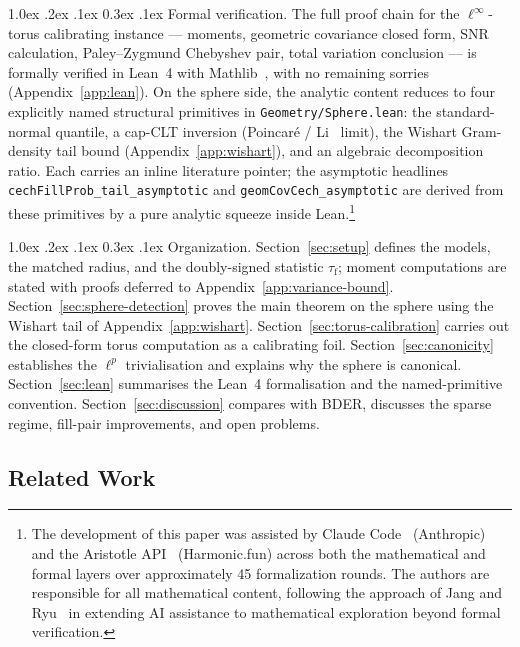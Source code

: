 \documentclass[reqno,12pt]{amsart}
\makeatletter
\renewcommand\paragraph{\@startsection{paragraph}{4}{\z@}%
  {1.0ex \@plus .2ex \@minus .1ex}%
  {0.3ex \@plus .1ex}%
  {\normalfont\normalsize\bfseries}}
\newcommand{\tauf}{\tau_{\mathrm{f}}}
\theoremstyle{plain}
\theoremstyle{definition}
\theoremstyle{remark}
\makeatother
\begin{document}
\paragraph{Formal verification.}
The full proof chain for the $\ell^\infty$-torus calibrating instance --- moments,
geometric covariance closed form, SNR calculation, Paley--Zygmund Chebyshev pair, total
variation conclusion --- is formally verified in Lean~4 with Mathlib~\cite{Mathlib2020},
with no remaining sorries (Appendix~\ref{app:lean}). On the sphere side, the analytic
content reduces to four explicitly named structural primitives in
\texttt{Geometry/Sphere.lean}: the standard-normal quantile, a cap-CLT inversion
(Poincar\'e / Li~\cite{Li2011} limit), the Wishart Gram-density tail bound
(Appendix~\ref{app:wishart}), and an algebraic decomposition ratio. Each carries an
inline literature pointer; the asymptotic headlines
\texttt{cechFillProb\_tail\_asymptotic} and \texttt{geomCovCech\_asymptotic} are
derived from these primitives by a pure analytic squeeze inside
Lean.\footnote{The development of this paper was assisted by Claude
Code~\cite{ClaudeCode2025} (Anthropic) and the Aristotle API~\cite{Aristotle2025}
(Harmonic.fun) across both the mathematical and formal layers over approximately 45
formalization rounds. The authors are responsible for all mathematical content,
following the approach of Jang and Ryu~\cite{JangRyu2026} in extending AI assistance to
mathematical exploration beyond formal verification.}

\paragraph{Organization.}
Section~\ref{sec:setup} defines the models, the matched radius, and the doubly-signed
statistic $\tauf$; moment computations are stated with proofs deferred to
Appendix~\ref{app:variance-bound}. Section~\ref{sec:sphere-detection} proves the main
theorem on the sphere using the Wishart tail of Appendix~\ref{app:wishart}.
Section~\ref{sec:torus-calibration} carries out the closed-form torus computation as a
calibrating foil. Section~\ref{sec:canonicity} establishes the $\ell^p$ trivialisation
and explains why the sphere is canonical. Section~\ref{sec:lean} summarises the Lean~4
formalisation and the named-primitive convention. Section~\ref{sec:discussion} compares
with BDER, discusses the sparse regime, fill-pair improvements, and open problems.

\subsection{Related Work}\label{sec:related}
\end{document}
